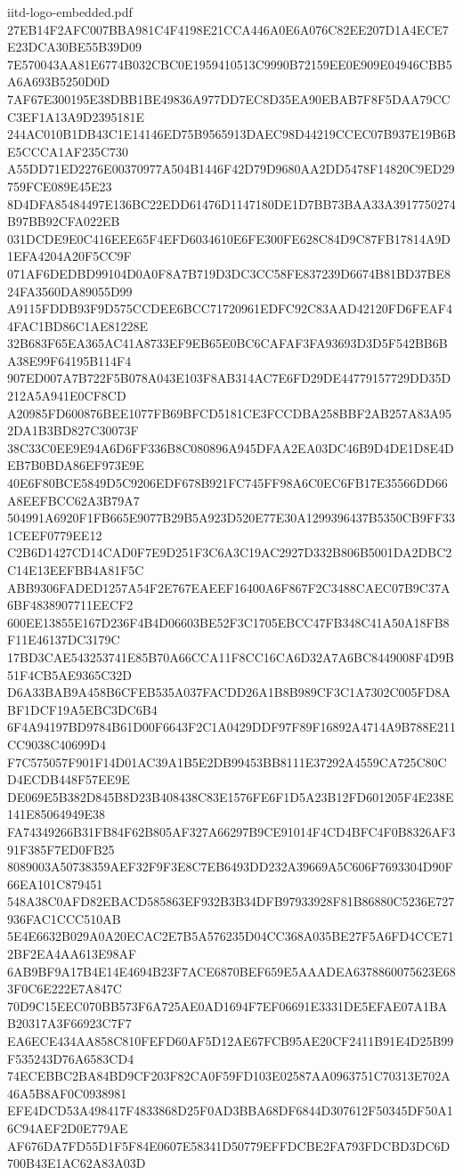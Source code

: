 \begin{filecontents*}[overwrite]{iitd-logo-embedded.pdf}
27EB14F2AFC007BBA981C4F4198E21CCA446A0E6A076C82EE207D1A4ECE7E23DCA30BE55B39D09
7E570043AA81E6774B032CBC0E1959410513C9990B72159EE0E909E04946CBB5A6A693B5250D0D
7AF67E300195E38DBB1BE49836A977DD7EC8D35EA90EBAB7F8F5DAA79CCC3EF1A13A9D2395181E
244AC010B1DB43C1E14146ED75B9565913DAEC98D44219CCEC07B937E19B6BE5CCCA1AF235C730
A55DD71ED2276E00370977A504B1446F42D79D9680AA2DD5478F14820C9ED29759FCE089E45E23
8D4DFA85484497E136BC22EDD61476D1147180DE1D7BB73BAA33A3917750274B97BB92CFA022EB
031DCDE9E0C416EEE65F4EFD6034610E6FE300FE628C84D9C87FB17814A9D1EFA4204A20F5CC9F
071AF6DEDBD99104D0A0F8A7B719D3DC3CC58FE837239D6674B81BD37BE824FA3560DA89055D99
A9115FDDB93F9D575CCDEE6BCC71720961EDFC92C83AAD42120FD6FEAF44FAC1BD86C1AE81228E
32B683F65EA365AC41A8733EF9EB65E0BC6CAFAF3FA93693D3D5F542BB6BA38E99F64195B114F4
907ED007A7B722F5B078A043E103F8AB314AC7E6FD29DE44779157729DD35D212A5A941E0CF8CD
A20985FD600876BEE1077FB69BFCD5181CE3FCCDBA258BBF2AB257A83A952DA1B3BD827C30073F
38C33C0EE9E94A6D6FF336B8C080896A945DFAA2EA03DC46B9D4DE1D8E4DEB7B0BDA86EF973E9E
40E6F80BCE5849D5C9206EDF678B921FC745FF98A6C0EC6FB17E35566DD66A8EEFBCC62A3B79A7
504991A6920F1FB665E9077B29B5A923D520E77E30A1299396437B5350CB9FF331CEEF0779EE12
C2B6D1427CD14CAD0F7E9D251F3C6A3C19AC2927D332B806B5001DA2DBC2C14E13EEFBB4A81F5C
ABB9306FADED1257A54F2E767EAEEF16400A6F867F2C3488CAEC07B9C37A6BF4838907711EECF2
600EE13855E167D236F4B4D06603BE52F3C1705EBCC47FB348C41A50A18FB8F11E46137DC3179C
17BD3CAE543253741E85B70A66CCA11F8CC16CA6D32A7A6BC8449008F4D9B51F4CB5AE9365C32D
D6A33BAB9A458B6CFEB535A037FACDD26A1B8B989CF3C1A7302C005FD8ABF1DCF19A5EBC3DC6B4
6F4A94197BD9784B61D00F6643F2C1A0429DDF97F89F16892A4714A9B788E211CC9038C40699D4
F7C575057F901F14D01AC39A1B5E2DB99453BB8111E37292A4559CA725C80CD4ECDB448F57EE9E
DE069E5B382D845B8D23B408438C83E1576FE6F1D5A23B12FD601205F4E238E141E85064949E38
FA74349266B31FB84F62B805AF327A66297B9CE91014F4CD4BFC4F0B8326AF391F385F7ED0FB25
8089003A50738359AEF32F9F3E8C7EB6493DD232A39669A5C606F7693304D90F66EA101C879451
548A38C0AFD82EBACD585863EF932B3B34DFB97933928F81B86880C5236E727936FAC1CCC510AB
5E4E6632B029A0A20ECAC2E7B5A576235D04CC368A035BE27F5A6FD4CCE712BF2EA4AA613E98AF
6AB9BF9A17B4E14E4694B23F7ACE6870BEF659E5AAADEA6378860075623E683F0C6E222E7A847C
70D9C15EEC070BB573F6A725AE0AD1694F7EF06691E3331DE5EFAE07A1BAB20317A3F66923C7F7
EA6ECE434AA858C810FEFD60AF5D12AE67FCB95AE20CF2411B91E4D25B99F535243D76A6583CD4
74ECEBBC2BA84BD9CF203F82CA0F59FD103E02587AA0963751C70313E702A46A5B8AF0C0938981
EFE4DCD53A498417F4833868D25F0AD3BBA68DF6844D307612F50345DF50A16C94AEF2D0E779AE
AF676DA7FD55D1F5F84E0607E58341D50779EFFDCBE2FA793FDCBD3DC6D700B43E1AC62A83A03D

\end{filecontents*}
